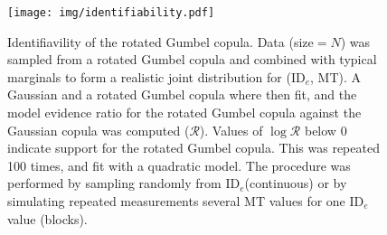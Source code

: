 \documentclass[acmlarge, manuscript,review]{acmart}
\newcommand{\ide}{\ensuremath{{\text{ID}_e}}\xspace}
\begin{document}
\begin{figure}[htbp]
	\centering
	\texttt{[image: img/identifiability.pdf]}
	\caption{Identifiavility of the rotated Gumbel copula. Data (size$=N$) was sampled from a rotated Gumbel copula and combined with typical marginals to form a realistic joint distribution for (\ide, MT). A Gaussian and a rotated Gumbel copula where then fit, and the model evidence ratio for the rotated Gumbel copula against the Gaussian copula was computed ($\mathcal{R}$). Values of $\log \mathcal{R}$ below 0 indicate support for the rotated Gumbel copula. This was repeated 100 times, and fit with a quadratic model. The procedure was performed by sampling randomly from \ide (continuous) or by simulating repeated measurements \ie several MT values for one \ide value (blocks).}
	\label{fig:identifiability}
\end{figure}


			
\end{document}
